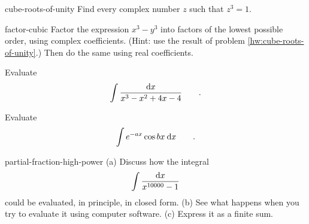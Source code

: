 \begin{hwsection}
\begin{hwwithsoln}{cube-roots-of-unity}
Find every complex number $z$ such that $z^3=1$.
\end{hwwithsoln}

\begin{hwwithsoln}{factor-cubic}
Factor the expression $x^3-y^3$ into factors of the lowest possible
order, using complex coefficients. (Hint: use the result of problem \ref{hw:cube-roots-of-unity}.) Then do the same using real
coefficients.
\end{hwwithsoln}


\begin{hw}
Evaluate
\begin{equation*}
  \int \frac{\textup{d} x}{x^3-x^2+4x-4} \qquad .
\end{equation*}
\end{hw}

\begin{hw}
Evaluate
\begin{equation*}
  \int e^{-ax}\cos bx \: \textup{d} x \qquad .
\end{equation*}
\end{hw}

\begin{hwwithsoln}[2]{partial-fraction-high-power}
(a) Discuss how the integral
\begin{equation*}
  \int \frac{\textup{d} x}{x^{10000}-1}
\end{equation*}
could be evaluated, in principle, in closed form. (b) See what happens when you try to evaluate it using computer software.
(c) Express it as a finite sum.
\end{hwwithsoln}

\end{hwsection}
